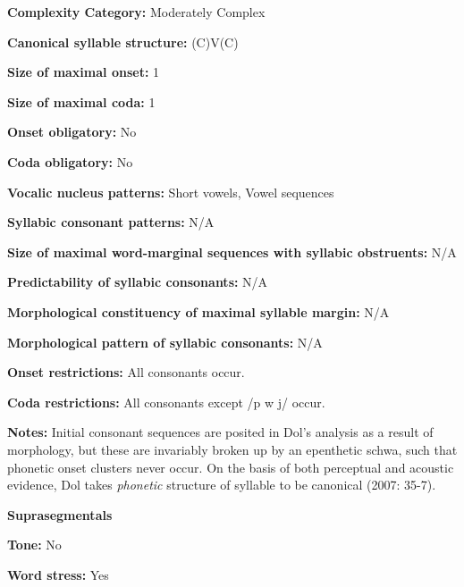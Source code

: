 \textbf{Complexity Category:} Moderately Complex



\textbf{Canonical syllable structure:} (C)V(C) \citep[34-8]{Dol2007}



\textbf{Size of maximal onset:} 1



\textbf{Size of maximal coda:} 1



\textbf{Onset obligatory:} No



\textbf{Coda obligatory:} No



\textbf{Vocalic nucleus patterns:} Short vowels, Vowel sequences



\textbf{Syllabic consonant patterns:} N/A



\textbf{Size of maximal word{}-marginal sequences with syllabic obstruents:} N/A



\textbf{Predictability of syllabic consonants:} N/A



\textbf{Morphological constituency of maximal syllable margin:} N/A



\textbf{Morphological pattern of syllabic consonants:} N/A



\textbf{Onset restrictions:} All consonants occur.



\textbf{Coda restrictions:} All consonants except /p w j/ occur.



\textbf{Notes:} Initial consonant sequences are posited in Dol’s analysis as a result of morphology, but these are invariably broken up by an epenthetic schwa, such that phonetic onset clusters never occur. On the basis of both perceptual and acoustic evidence, Dol takes \textit{phonetic} structure of syllable to be canonical (2007: 35-7).



\textbf{Suprasegmentals}



\textbf{Tone:} No



\textbf{Word stress:} Yes



